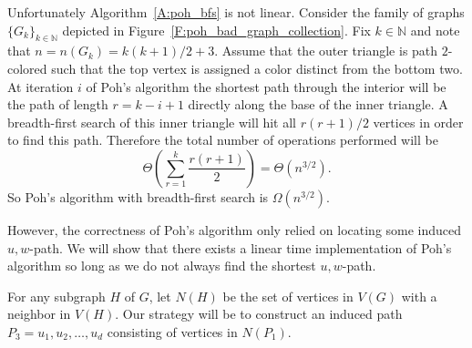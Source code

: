 \documentclass[12pt,letterpaper]{article}
\theoremstyle{plain}
\theoremstyle{definition}
\theoremstyle{break}
\begin{document}
Unfortunately Algorithm~\ref{A:poh_bfs}
is not linear. Consider the family of
graphs $\{G_k\}_{k\in\mathbb{N}}$ depicted in
Figure~\ref{F:poh_bad_graph_collection}. Fix $k\in\mathbb{N}$ and note that
$n=n(G_k)=k(k+1)/2+3$. Assume
that the outer triangle is path $2$-colored such that the top vertex is
assigned a color distinct from the bottom two. At iteration $i$ of Poh's
algorithm the shortest path through the interior will be the path of length
$r=k-i+1$ directly along the base of the inner triangle. A breadth-first search
of this inner triangle will hit all $r(r+1)/2$ vertices in order to find this
path. Therefore the total number of operations performed will be
\[
    \Theta\left( \sum_{r=1}^k\frac{r(r+1)}{2} \right)=\Theta(n^{3/2}).
\]
So Poh's algorithm with breadth-first search is $\Omega(n^{3/2})$.

However, the correctness of Poh's algorithm only relied on
locating some induced $u,w$-path.
We will show that there exists a linear time implementation of Poh's
algorithm so long as we do not always find the shortest $u,w$-path.

For any subgraph $H$ of $G$, let $N(H)$ be the set of vertices in $V(G)$ with a
neighbor in $V(H)$. Our strategy will be to construct an induced
path $P_3=u_1,u_2,\ldots,u_d$ consisting of vertices in $N(P_1)$.
\end{document}
